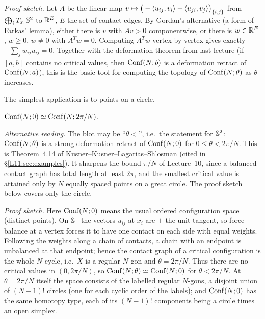 \begin{addedblock}
\emph{Proof sketch.} Let $A$ be the linear map $v\mapsto\big(-\langle u_{ij}, v_i\rangle-\langle u_{ji}, v_j\rangle\big)_{\{i,j\}}$ from $\bigoplus_i T_{x_i}\mathbb{S}^2$ to $\mathbb{R}^{E}$, $E$ the set of contact edges. By Gordan's alternative (a form of Farkas' lemma), either there is $v$ with $Av>0$ componentwise, or there is $w\in\mathbb{R}^E$, $w\ge0$, $w\ne0$ with $A^{T}w=0$. Computing $A^Tw$ vertex by vertex gives exactly $-\sum_j w_{ij}u_{ij}=0$. Together with the deformation theorem from last lecture (if $[a,b]$ contains no critical values, then $\operatorname{Conf}(N;b)$ is a deformation retract of $\operatorname{Conf}(N;a)$), this is the basic tool for computing the topology of $\operatorname{Conf}(N;\theta)$ as $\theta$ increases.
\end{addedblock}

The simplest application is to points on a circle.

\begin{theorem}\label{L11:thm:circle}
 $\operatorname{Conf}(N;0)\simeq\operatorname{Conf}(N;2\pi/N)$.
\end{theorem}
\begin{addedblock}
\emph{Alternative reading.} The blot may be ``$\theta<$'', i.e.\ the statement for $\mathbb{S}^2$:
$\operatorname{Conf}(N;\theta)$ is a strong deformation retract of $\operatorname{Conf}(N;0)$ for $0\le\theta<2\pi/N$. This is
Theorem~4.14 of Kusner--Kusner--Lagarias--Shlosman (cited in \S\ref{L11:sec:examples}). It sharpens
the bound $\pi/N$ of Lecture~10, since a balanced contact graph has total length at least $2\pi$,
and the smallest critical value is attained only by $N$ equally spaced points on a great circle. The
proof sketch below covers only the circle.
\end{addedblock}

\begin{addedblock}
\emph{Proof sketch.} Here $\operatorname{Conf}(N;0)$ means the usual ordered configuration space (distinct points). On $\mathbb{S}^1$ the vectors $u_{ij}$ at $x_i$ are $\pm$ the unit tangent, so force balance at a vertex forces it to have one contact on each side with equal weights. Following the weights along a chain of contacts, a chain with an endpoint is unbalanced at that endpoint; hence the contact graph of a critical configuration is the whole $N$-cycle, i.e.\ $X$ is a regular $N$-gon and $\theta=2\pi/N$. Thus there are no critical values in $(0,2\pi/N)$, so $\operatorname{Conf}(N;\theta)\simeq\operatorname{Conf}(N;0)$ for $\theta<2\pi/N$. At $\theta=2\pi/N$ itself the space consists of the labelled regular $N$-gons, a disjoint union of $(N-1)!$ circles (one for each cyclic order of the labels); and $\operatorname{Conf}(N;0)$ has the same homotopy type, each of its $(N-1)!$ components being a circle times an open simplex.
\end{addedblock}

